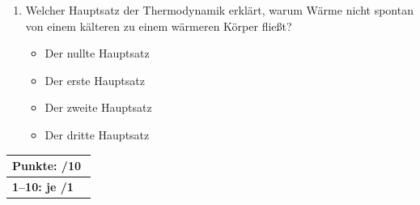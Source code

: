 \documentclass[11pt, a4paper]{article}
\begin{document}
\begin{enumerate}[label=\arabic*.,itemsep=18pt]
    \item Welcher Hauptsatz der Thermodynamik erklärt, warum Wärme nicht spontan von einem kälteren zu einem wärmeren Körper fließt?
    \begin{itemize}[label={$\square$},itemsep=1pt,topsep=0pt]
        \item Der nullte Hauptsatz
        \item Der erste Hauptsatz
        \item Der zweite Hauptsatz
        \item Der dritte Hauptsatz
    \end{itemize}
\end{enumerate}

\vfill
\begin{flushright}
\renewcommand{\arraystretch}{1.23}
\begin{tabular}{|l c|}
\hline
\multicolumn{2}{|l|}{\textbf{\large{Punkte: \quad\quad\quad /10}}}\\
\hline
\textbf{1--10: je /1} & \\
\hline
\end{tabular}
\end{flushright}
\end{document}
